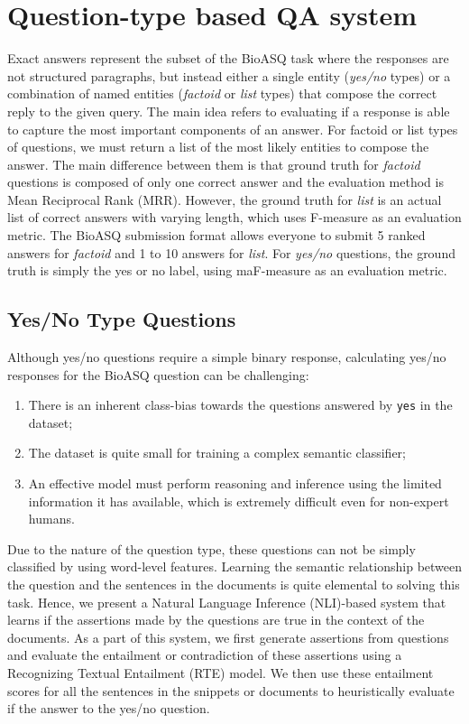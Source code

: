 \section{Question-type based QA system}

\label{approach2}
Exact answers represent the subset of the BioASQ task where the responses are not structured paragraphs, but instead either a single entity (\textit{yes/no} types) or a combination of named entities (\textit{factoid} or \textit{list} types) that compose the correct reply to the given query. The main idea refers to evaluating if a response is able to capture the most important components of an answer. For factoid or list types of questions, we must return a list of the most likely entities to compose the answer. The main difference between them is that ground truth for \textit{factoid} questions is composed of only one correct answer and the evaluation method is Mean Reciprocal Rank (MRR). However, the ground truth for \textit{list} is an actual list of correct answers with varying length, which uses F-measure as an evaluation metric. The BioASQ submission format allows everyone to submit 5 ranked answers for \textit{factoid} and 1 to 10 answers for \textit{list}. For \textit{yes/no} questions, the ground truth is simply the yes or no label, using maF-measure as an evaluation metric.

\subsection{Yes/No Type Questions}

Although yes/no questions require a simple binary response, calculating yes/no responses for the BioASQ question can be challenging: 
\begin{enumerate}
    \item There is an inherent class-bias towards the questions answered by \texttt{yes} in the dataset;
    \item The dataset is quite small for training a complex semantic classifier;
    \item An effective model must perform  reasoning and inference using the limited information it has available, which is extremely difficult even for non-expert humans.
\end{enumerate}

Due to the nature of the question type, these questions can not be simply classified by using word-level features. Learning the semantic relationship between the question and the sentences in the documents is quite elemental to solving this task. Hence, we present a Natural Language Inference (NLI)-based system that learns if the assertions made by the questions are true in the context of the documents. As a part of this system, we first generate assertions from questions and evaluate the entailment or contradiction of these assertions using a Recognizing Textual Entailment (RTE) model. We then use these entailment scores for all the sentences in the snippets or documents to heuristically evaluate if the answer to the yes/no question.

